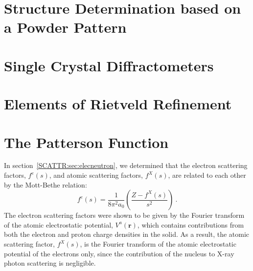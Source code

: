 
\section{Structure Determination based on a Powder Pattern}\label{\chabbr:sec:SDpowder}






\section{Single Crystal Diffractometers}\label{\chabbr:sec:SCDiff}


\section{Elements of Rietveld Refinement}\label{\chabbr:sec:Rietveld}


\section{The Patterson Function}\label{\chabbr:sec:Patterson}
In section~\ref{SCATTR:sec:elecneutron}, we determined that the electron scattering factors, $f^e(s)$, and atomic scattering factors, $f^X(s)$, are related to each other by the Mott-Bethe relation:
\begin{equation}
	f^e(s) = \frac{1}{8\pi^2a_0}\left(\frac{Z-f^X(s)}{s^2}\right)\ .\label{\chabbr:eq:MottBethe}
\end{equation}
The electron scattering factors were shown to be given by the Fourier transform of the atomic electrostatic potential, $V^a(\mathbf{r})$, which contains contributions from both the electron and proton charge densities in the solid. As a result, the atomic scattering factor, $f^X(s)$, is the Fourier transform of the atomic electrostatic potential of the electrons only, since the contribution of the nucleus to X-ray photon scattering is negligible.  

